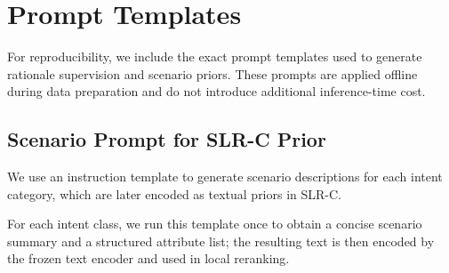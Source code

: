 

\section{Prompt Templates}

For reproducibility, we include the exact prompt templates used to generate rationale supervision and scenario priors. These prompts are applied offline during data preparation and do not introduce additional inference-time cost.

\subsection{Scenario Prompt for SLR-C Prior}
\label{app:scenario_prompt}

We use an instruction template to generate scenario descriptions for each intent category, which are later encoded as textual priors in SLR-C.

For each intent class, we run this template once to obtain a concise scenario summary and a structured attribute list; the resulting text is then encoded by the frozen text encoder and used in local reranking.

